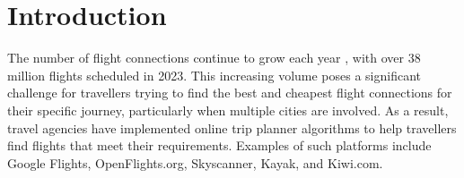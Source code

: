 \section{Introduction}

%

The number of flight connections continue to grow each year \cite{statista_flights_year}, with over 38 million flights scheduled in 2023. This increasing volume poses a significant challenge for travellers trying to find the best and cheapest flight connections for their specific journey, particularly when multiple cities are involved. As a result, travel agencies have implemented online trip planner algorithms to help travellers find flights that meet their requirements. Examples of such platforms include Google Flights, OpenFlights.org, Skyscanner, Kayak, and Kiwi.com.

